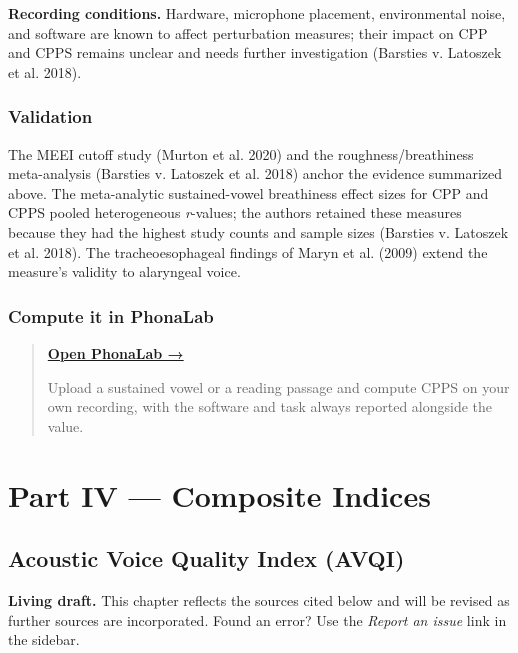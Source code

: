 \documentclass[
  english,
  letterpaper,
]{scrbook}
\begin{document}
\textbf{Recording conditions.} Hardware, microphone placement,
environmental noise, and software are known to affect perturbation
measures; their impact on CPP and CPPS remains unclear and needs further
investigation (Barsties v. Latoszek et al. 2018).

\section{Validation}\label{validation}

The MEEI cutoff study (Murton et al. 2020) and the roughness/breathiness
meta-analysis (Barsties v. Latoszek et al. 2018) anchor the evidence
summarized above. The meta-analytic sustained-vowel breathiness effect
sizes for CPP and CPPS pooled heterogeneous \emph{r}-values; the authors
retained these measures because they had the highest study counts and
sample sizes (Barsties v. Latoszek et al. 2018). The tracheoesophageal
findings of Maryn et al. (2009) extend the measure's validity to
alaryngeal voice.

\section{Compute it in PhonaLab}\label{compute-it-in-phonalab}

\begin{quote}
\textbf{\href{https://phonalab.com}{Open PhonaLab →}}

Upload a sustained vowel or a reading passage and compute CPPS on your
own recording, with the software and task always reported alongside the
value.
\end{quote}

\part{Part IV --- Composite Indices}

\chapter{Acoustic Voice Quality Index
(AVQI)}\label{acoustic-voice-quality-index-avqi}

\begin{tcolorbox}[enhanced jigsaw, arc=.35mm, bottomrule=.15mm, bottomtitle=1mm, breakable, colback=white, colbacktitle=quarto-callout-note-color!10!white, colframe=quarto-callout-note-color-frame, coltitle=black, left=2mm, leftrule=.75mm, opacityback=0, opacitybacktitle=0.6, rightrule=.15mm, title=\textcolor{quarto-callout-note-color}{\faInfo}\hspace{0.5em}{Note}, titlerule=0mm, toprule=.15mm, toptitle=1mm]

\textbf{Living draft.} This chapter reflects the sources cited below and
will be revised as further sources are incorporated. Found an error? Use
the \emph{Report an issue} link in the sidebar.

\end{tcolorbox}
\end{document}
